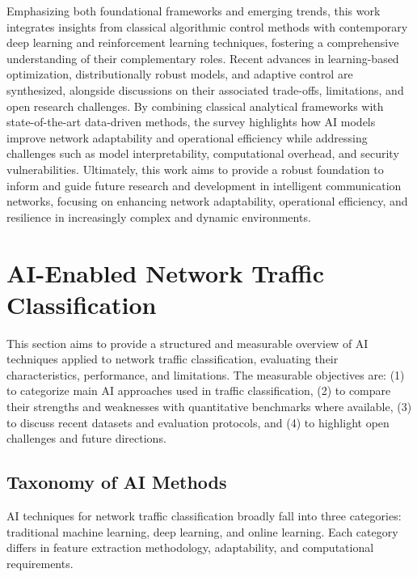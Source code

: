 \documentclass[sigconf]{acmart}
\begin{document}
Emphasizing both foundational frameworks and emerging trends, this work integrates insights from classical algorithmic control methods with contemporary deep learning and reinforcement learning techniques, fostering a comprehensive understanding of their complementary roles. Recent advances in learning-based optimization, distributionally robust models, and adaptive control are synthesized, alongside discussions on their associated trade-offs, limitations, and open research challenges. By combining classical analytical frameworks with state-of-the-art data-driven methods, the survey highlights how AI models improve network adaptability and operational efficiency while addressing challenges such as model interpretability, computational overhead, and security vulnerabilities. Ultimately, this work aims to provide a robust foundation to inform and guide future research and development in intelligent communication networks, focusing on enhancing network adaptability, operational efficiency, and resilience in increasingly complex and dynamic environments.

\section{AI-Enabled Network Traffic Classification}

This section aims to provide a structured and measurable overview of AI techniques applied to network traffic classification, evaluating their characteristics, performance, and limitations. The measurable objectives are: (1) to categorize main AI approaches used in traffic classification, (2) to compare their strengths and weaknesses with quantitative benchmarks where available, (3) to discuss recent datasets and evaluation protocols, and (4) to highlight open challenges and future directions.

\subsection{Taxonomy of AI Methods}

AI techniques for network traffic classification broadly fall into three categories: traditional machine learning, deep learning, and online learning. Each category differs in feature extraction methodology, adaptability, and computational requirements.
\end{document}
